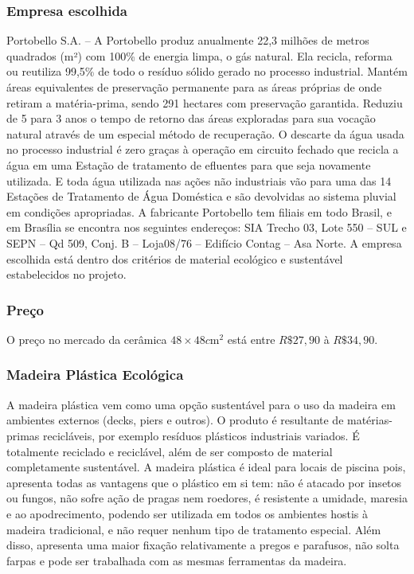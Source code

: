 \subsubsection*{\textbf{Empresa escolhida}}

Portobello S.A. – A Portobello produz anualmente 22,3 milhões de metros quadrados (m²) com 100\% de energia limpa, o gás natural. Ela recicla, reforma ou reutiliza 99,5\% de todo o resíduo sólido gerado no processo industrial. Mantém áreas equivalentes de preservação permanente para as áreas próprias de onde retiram a matéria-prima, sendo 291 hectares com preservação garantida. Reduziu de 5 para 3 anos o tempo de retorno das áreas exploradas para sua vocação natural através de um especial método de recuperação.
O descarte da água usada no processo industrial é zero graças à operação em circuito fechado que recicla a água em uma Estação de tratamento de efluentes para que seja novamente utilizada. E toda água utilizada nas ações não industriais vão para uma das 14 Estações de Tratamento de Água Doméstica e são devolvidas ao sistema pluvial em condições apropriadas.
A fabricante Portobello tem filiais em todo Brasil, e em Brasília se encontra nos seguintes endereços: SIA Trecho 03, Lote 550 – SUL e SEPN – Qd 509, Conj. B – Loja08/76 – Edifício Contag – Asa Norte.
A empresa escolhida está dentro dos critérios de material ecológico e sustentável estabelecidos no projeto.




\subsubsection*{\textbf{Preço}}
	
	O preço no mercado da cerâmica $48\times48 c\si{\meter}^{2}$ está entre $R\$ 27,90$ à $R\$ 34,90$.\cite{precoCeramica}


\subsubsection*{\textbf{Madeira Plástica Ecológica}}
	
A madeira plástica vem como uma opção sustentável para o uso da madeira em ambientes externos (decks, piers e outros). O produto é resultante de matérias-primas recicláveis, por exemplo resíduos plásticos industriais variados\cite{EcoCasa}. É totalmente reciclado e reciclável, além de ser composto de material completamente sustentável\cite{ReWood}. A madeira plástica é ideal para locais de piscina pois, apresenta todas as vantagens que o plástico em si tem: não é atacado por insetos ou fungos, não sofre ação de pragas nem roedores, é resistente a umidade, maresia e ao apodrecimento, podendo ser utilizada em todos os ambientes hostis à madeira tradicional, e não requer nenhum tipo de tratamento especial. Além disso, apresenta uma maior fixação relativamente a pregos e parafusos, não solta farpas e pode ser trabalhada com as mesmas ferramentas da madeira.


